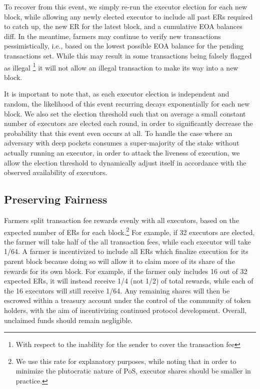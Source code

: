\documentclass[conference]{IEEEtran}
\begin{document}
To recover from this event, we simply re-run the executor election for each new block, while allowing any newly elected executor to include all past ERs required to catch up, the new ER for the latest block, and a cumulative EOA balances diff. In the meantime, farmers may continue to verify new transactions pessimistically, i.e., based on the lowest possible EOA balance for the pending transactions set. While this may result in some transactions being falsely flagged as illegal \footnote{With respect to the inability for the sender to cover the transaction fee} it will not allow an illegal transaction to make its way into a new block. 

It is important to note that, as each executor election is independent and random, the likelihood of this event recurring decays exponentially for each new block. We also set the election threshold such that on average a small constant number of executors are elected each round, in order to significantly decrease the probability that this event even occurs at all. To handle the case where an adversary with deep pockets consumes a super-majority of the stake without actually running an executor, in order to attack the liveness of execution, we allow the election threshold to dynamically adjust itself in accordance with the observed availability of executors.

\subsection{Preserving Fairness}

Farmers split transaction fee rewards evenly with all executors, based on the expected number of ERs for each block.\footnote{We use this rate for explanatory purposes, while noting that in order to minimize the plutocratic nature of PoS, executor shares should be smaller in practice.} For example, if 32 executors are elected, the farmer will take half of the all transaction fees, while each executor will take 1/64. A farmer is incentivized to include all ERs which finalize execution for its parent block because doing so will allow it to claim more of its share of the rewards for its own block. For example, if the farmer only includes 16 out of 32 expected ERs, it will instead receive 1/4 (not 1/2) of total rewards, while each of the 16 executors will still receive 1/64. Any remaining shares will then be escrowed within a treasury account under the control of the community of token holders, with the aim of incentivizing continued protocol development. Overall, unclaimed funds should remain negligible. 
\end{document}
